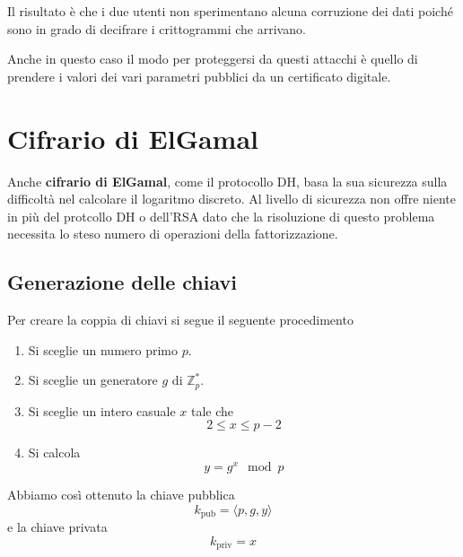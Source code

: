 Il risultato \`e che i due utenti non sperimentano alcuna corruzione dei dati poich\'e sono in grado di decifrare
i crittogrammi che arrivano.

Anche in questo caso il modo per proteggersi da questi attacchi \`e quello di prendere i valori dei vari parametri
pubblici da un certificato digitale.

\section{Cifrario di ElGamal}
Anche \textbf{cifrario di ElGamal}, come il protocollo DH, basa la sua sicurezza sulla difficolt\`a nel calcolare il
logaritmo discreto. Al livello di sicurezza non offre niente in pi\`u del protcollo DH o dell'RSA dato che la
risoluzione di questo problema necessita lo steso numero di operazioni della fattorizzazione.

\subsection{Generazione delle chiavi}
Per creare la coppia di chiavi si segue il seguente procedimento
\begin{enumerate}
	\item Si sceglie un numero primo $p$.
	\item Si sceglie un generatore $g$ 	di $\mathbb{Z}_p^*$.
	\item Si sceglie un intero casuale $x$ tale che
	      \[ 2 \leq x \leq p-2 \]
	\item Si calcola
	      \[ y = g^x \mod{p} \]
\end{enumerate}
Abbiamo cos\`i ottenuto la chiave pubblica
\[ k_\text{pub} = \langle p, g, y \rangle \]
e la chiave privata
\[ k_\text{priv} = x \]

